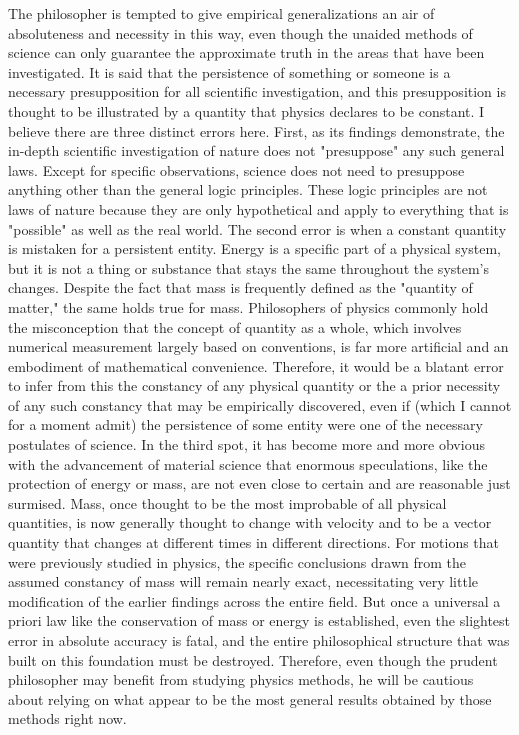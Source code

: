 \documentclass[a4paper,12pt]{book}[2004/02/16]
\theoremstyle{ilemma}
\theoremstyle{itheorem}
\theoremstyle{iother}
\theoremstyle{icorollary}
\theoremstyle{numcorollary}
\theoremstyle{idefinition}
\begin{document}
The philosopher is tempted to give empirical generalizations an air of absoluteness and necessity in this way, even though the unaided methods of science can only guarantee the approximate truth in the areas that have been investigated. It is said that the persistence of something or someone is a necessary presupposition for all scientific investigation, and this presupposition is thought to be illustrated by a quantity that physics declares to be constant. I believe there are three distinct errors here. First, as its findings demonstrate, the in-depth scientific investigation of nature does not "presuppose" any such general laws. Except for specific observations, science does not need to presuppose anything other than the general logic principles. These logic principles are not laws of nature because they are only hypothetical and apply to everything that is "possible" as well as the real world. The second error is when a constant quantity is mistaken for a persistent entity. Energy is a specific part of a physical system, but it is not a thing or substance that stays the same throughout the system's changes. Despite the fact that mass is frequently defined as the "quantity of matter," the same holds true for mass. Philosophers of physics commonly hold the misconception that the concept of quantity as a whole, which involves numerical measurement largely based on conventions, is far more artificial and an embodiment of mathematical convenience. Therefore, it would be a blatant error to infer from this the constancy of any physical quantity or the a prior necessity of any such constancy that may be empirically discovered, even if (which I cannot for a moment admit) the persistence of some entity were one of the necessary postulates of science. In the third spot, it has become more and
more obvious with the advancement of material science that enormous speculations,
like the protection of energy or mass, are not even close to certain and
are reasonable just surmised. Mass, once thought to be the most improbable of all physical quantities, is now generally thought to change with velocity and to be a vector quantity that changes at different times in different directions. For motions that were previously studied in physics, the specific conclusions drawn from the assumed constancy of mass will remain nearly exact, necessitating very little modification of the earlier findings across the entire field. But once a universal a priori law like the conservation of mass or energy is established, even the slightest error in absolute accuracy is fatal, and the entire philosophical structure that was built on this foundation must be destroyed. Therefore, even though the prudent philosopher may benefit from studying physics methods, he will be cautious about relying on what appear to be the most general results obtained by those methods right now.
\end{document}

